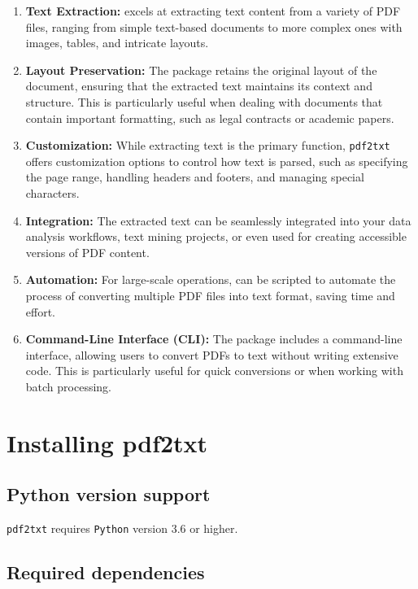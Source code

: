 \begin{enumerate}
	\item \textbf{Text Extraction:}  excels at extracting text content from a variety of PDF files, ranging from simple text-based documents to more complex ones with images, tables, and intricate layouts.
	
	\item \textbf{Layout Preservation:} The package retains the original layout of the document, ensuring that the extracted text maintains its context and structure. This is particularly useful when dealing with documents that contain important formatting, such as legal contracts or academic papers.
	
	\item \textbf{Customization:} While extracting text is the primary function, \texttt{pdf2txt} offers customization options to control how text is parsed, such as specifying the page range, handling headers and footers, and managing special characters.
	
	\item \textbf{Integration:} The extracted text can be seamlessly integrated into your data analysis workflows, text mining projects, or even used for creating accessible versions of PDF content.
	
	\item \textbf{Automation:} For large-scale operations,  can be scripted to automate the process of converting multiple PDF files into text format, saving time and effort.
	
	\item \textbf{Command-Line Interface (CLI):} The package includes a command-line interface, allowing users to convert PDFs to text without writing extensive code. This is particularly useful for quick conversions or when working with batch processing.
\end{enumerate}


\section{Installing pdf2txt}

\subsection{Python version support}

\texttt{pdf2txt} requires \texttt{Python} version 3.6 or higher.

\subsection{Required dependencies}

